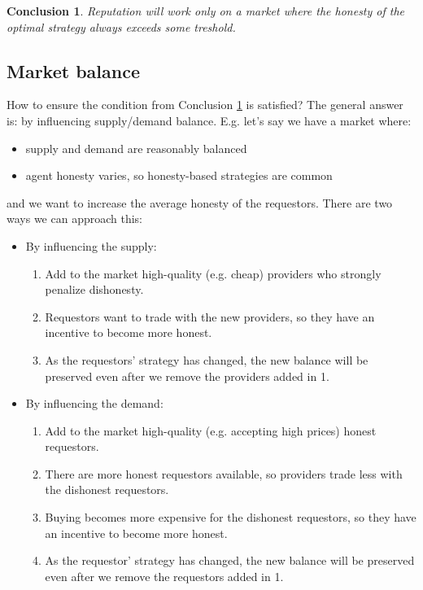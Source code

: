 \documentclass{article}
\newtheorem{conclusion}{Conclusion}[section]
\begin{document}
\begin{conclusion}
Reputation will work only on a market where the honesty of the optimal strategy always exceeds some treshold.
\label{required honesty level}
\end{conclusion}

\subsection{Market balance}
How to ensure the condition from Conclusion \ref{required honesty level} is satisfied? The general answer is: by influencing supply/demand balance.
E.g. let's say we have a market where:
\begin{itemize}
    \item supply and demand are reasonably balanced
    \item agent honesty varies, so honesty-based strategies are common
\end{itemize}
and we want to increase the average honesty of the requestors. There are two ways we can approach this:

\begin{itemize}
    \item By influencing the supply:
        \begin{enumerate}
            \item Add to the market high-quality (e.g. cheap) providers who strongly penalize dishonesty.
            \item Requestors want to trade with the new providers, so they have an incentive to become more honest.
            \item As the requestors' strategy has changed, the new balance will be preserved even after we remove the providers added in 1.
        \end{enumerate}
    \item By influencing the demand:
        \begin{enumerate}
            \item Add to the market high-quality (e.g. accepting high prices) honest requestors.
            \item There are more honest requestors available, so providers trade less with the dishonest requestors.
            \item Buying becomes more expensive for the dishonest requestors, so they have an incentive to become more honest.
            \item As the requestor' strategy has changed, the new balance will be preserved even after we remove the requestors added in 1.
        \end{enumerate}
\end{itemize}
\end{document}
